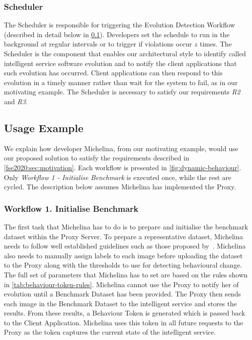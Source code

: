 \subsubsection{Scheduler} \label{fse2020:sec:components:scheduler} The Scheduler is responsible for triggering the Evolution Detection Workflow (described in detail below in \cref{fse2020:sec:workflow}). Developers set the schedule to run in the background at regular intervals or to trigger if violations occur $z$ times. The Scheduler is the component that enables our architectural style to identify called intelligent service software evolution and to notify the client applications that such evolution has occurred. Client applications can then respond to this evolution in a timely manner rather than wait for the system to fail, as in our motivating example. The Scheduler is necessary to satisfy our requirements \textit{R2} and \textit{R3}.


\subsection{Usage Example}
\label{fse2020:sec:workflow}

We explain how developer Michelina, from our motivating example, would use our proposed solution to satisfy the requirements described in \cref{fse2020:sec:motivation}. Each workflow is presented in \cref{fig:dynamic-behaviour}. Only \textit{Workflow 1 - Initialise Benchmark} is executed once, while the rest are cycled. The description below assumes Michelina has implemented the Proxy.

\subsubsection{Workflow 1. Initialise Benchmark}

The first task that Michelina has to do is to prepare and initialise the benchmark dataset within the Proxy Server. To prepare a representative dataset, Michelina needs to follow well established guidelines such as those proposed by~\citeauthor{pyle1999data}. Michelina also needs to manually assign labels to each image before uploading the dataset to the Proxy along with the thresholds to use for detecting behavioural change. The full set of parameters that Michelina has to set are based on the rules shown in \cref{tab:behaviour-token-rules}. Michelina cannot use the Proxy to notify her of evolution until a Benchmark Dataset has been provided. The Proxy then sends each image in the Benchmark Dataset to the intelligent service and stores the results. From these results, a Behaviour Token is generated which is passed back to the Client Application. Michelina uses this token in all future requests to the Proxy as the token captures the current state of the intelligent service.     


